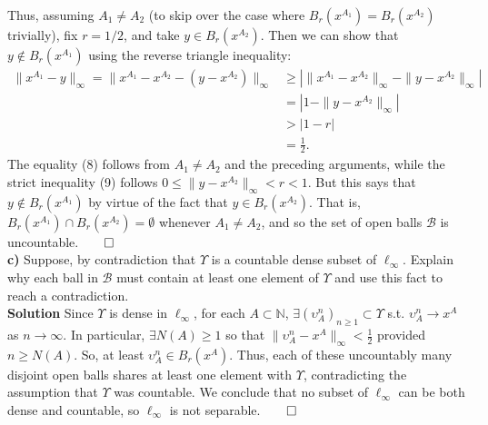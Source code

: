 \documentclass[10pt]{article}
\newcommand{\mbb}[1]{\mathbb{#1}}
\newcommand{\1}[1]{\mathbbm{1}_{#1}}
\newcommand{\mc}[1]{\mathcal{#1}}
\begin{document}
    Thus, assuming $A_1\neq A_2$ (to skip over the case where $B_r(x^{A_1})=B_r(x^{A_2})$ trivially), fix $r=1/2$, and take $y\in B_r(x^{A_2})$. Then we can show that $y\notin B_r(x^{A_1})$ using
    the reverse triangle inequality:
    \begin{align*}
        \|x^{A_1}-y\|_\infty=\|x^{A_1}-x^{A_2}-(y-x^{A_2})\|_\infty&\geq\left|\|x^{A_1}-x^{A_2}\|_\infty-\|y-x^{A_2}\|_\infty\right|\\
        &=\left|1-\|y-x^{A_2}\|_\infty\right|\tag{8}\\
        &>|1-r|\tag{9}\\
        &=\frac{1}{2}.
    \end{align*}
    The equality (8) follows from $A_1\neq A_2$ and the preceding arguments, while the strict inequality (9) follows $0\leq\|y-x^{A_2}\|_\infty<r<1$.
    But this says that $y\notin B_r(x^{A_1})$ by virtue of the fact that $y\in B_r(x^{A_2})$. That is, $B_r(x^{A_1})\cap B_r(x^{A_2})=\emptyset$ whenever $A_1\neq A_2$, 
    and so the set of open balls $\mc{B}$ is uncountable.\hfill{$\qed$}\\[5pt]
    {\bf c)} Suppose, by contradiction that $\Upsilon$ is a countable dense subset of $\ell_\infty$. Explain why each ball in $\mc{B}$
    must contain at least one element of $\Upsilon$ and use this fact to reach a contradiction.\\[5pt]
    {\bf Solution} Since $\Upsilon$ is dense in $\ell_\infty$, for each $A\subset\mbb{N}$, $\exists(\upsilon^n_A)_{n\geq 1}\subset\Upsilon$ s.t. $\upsilon^n_A\rightarrow x^A$ as $n\rightarrow\infty$.
    In particular, $\exists N(A)\geq 1$ so that $\|\upsilon^n_A-x^A\|_\infty<\tfrac{1}{2}$ provided $n\geq N(A)$. So, at least $\upsilon^n_A\in B_r(x^A)$. Thus, each of these uncountably many
    disjoint open balls shares at least one element with $\Upsilon$, contradicting the assumption that $\Upsilon$ was countable. We conclude that no subset of $\ell_\infty$ can be both dense
    and countable, so $\ell_\infty$ is not separable.\hfill{$\qed$}\\[5pt]
\end{document}
